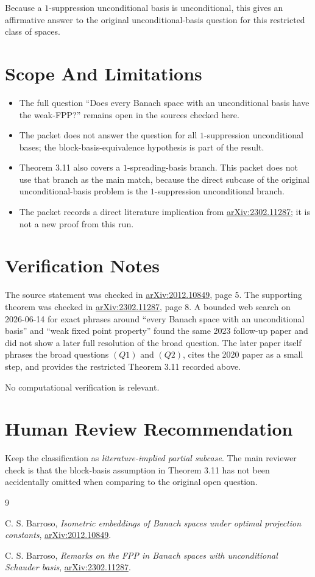 \documentclass[11pt]{article}
\newcommand{\arxiv}[1]{\href{https://arxiv.org/abs/#1}{arXiv:#1}}
\begin{document}
Because a \(1\)-suppression unconditional basis is unconditional, this gives
an affirmative answer to the original unconditional-basis question for this
restricted class of spaces.

\section*{Scope And Limitations}

\begin{itemize}
\item The full question ``Does every Banach space with an unconditional basis
  have the weak-FPP?'' remains open in the sources checked here.
\item The packet does not answer the question for all \(1\)-suppression
  unconditional bases; the block-basis-equivalence hypothesis is part of the
  result.
\item Theorem 3.11 also covers a \(1\)-spreading-basis branch.  This packet
  does not use that branch as the main match, because the direct subcase of
  the original unconditional-basis problem is the \(1\)-suppression
  unconditional branch.
\item The packet records a direct literature implication from
  \arxiv{2302.11287}; it is not a new proof from this run.
\end{itemize}

\section*{Verification Notes}

The source statement was checked in \arxiv{2012.10849}, page 5.  The
supporting theorem was checked in \arxiv{2302.11287}, page 8.  A bounded web
search on 2026-06-14 for exact phrases around ``every Banach space with an
unconditional basis'' and ``weak fixed point property'' found the same 2023
follow-up paper and did not show a later full resolution of the broad
question.  The later paper itself phrases the broad questions \((Q1)\) and
\((Q2)\), cites the 2020 paper as a small step, and provides the restricted
Theorem 3.11 recorded above.

No computational verification is relevant.

\section*{Human Review Recommendation}

Keep the classification as \emph{literature-implied partial subcase}.  The
main reviewer check is that the block-basis assumption in Theorem 3.11 has
not been accidentally omitted when comparing to the original open question.

\begin{thebibliography}{9}

C. S. Barroso,
\emph{Isometric embeddings of Banach spaces under optimal projection
constants},
\arxiv{2012.10849}.

C. S. Barroso,
\emph{Remarks on the FPP in Banach spaces with unconditional Schauder basis},
\arxiv{2302.11287}.

\end{thebibliography}
\end{document}

